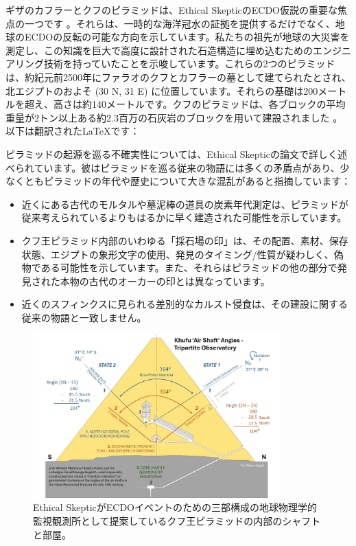 \documentclass[10pt,twocolumn,letterpaper]{article}
\begin{document}
ギザのカフラーとクフのピラミッドは、Ethical SkepticのECDO仮説の重要な焦点の一つです \cite{27}。それらは、一時的な海洋冠水の証拠を提供するだけでなく、地球のECDOの反転の可能な方向を示しています。私たちの祖先が地球の大災害を測定し、この知識を巨大で高度に設計された石造構造に埋め込むためのエンジニアリング技術を持っていたことを示唆しています。これらの2つのピラミッドは、約紀元前2500年にファラオのクフとカフラーの墓として建てられたとされ、北エジプトのおよそ (30 N, 31 E) に位置しています。それらの基礎は200メートルを超え、高さは約140メートルです。クフのピラミッドは、各ブロックの平均重量が2トン以上ある約2.3百万の石灰岩のブロックを用いて建設されました \cite{24, 25}。
以下は翻訳されたLaTeXです：

ピラミッドの起源を巡る不確実性については、Ethical Skepticの論文で詳しく述べられています。彼はピラミッドを巡る従来の物語には多くの矛盾点があり、少なくともピラミッドの年代や歴史について大きな混乱があると指摘しています：

\begin{flushleft}
\begin{itemize}
    \item 近くにある古代のモルタルや墓泥棒の道具の炭素年代測定は、ピラミッドが従来考えられているよりもはるかに早く建造された可能性を示しています。
    \item クフ王ピラミッド内部のいわゆる「採石場の印」は、その配置、素材、保存状態、エジプトの象形文字の使用、発見のタイミング/性質が疑わしく、偽物である可能性を示しています。また、それらはピラミッドの他の部分で発見された本物の古代のオーカーの印とは異なっています。
    \item 近くのスフィンクスに見られる差別的なカルスト侵食は、その建設に関する従来の物語と一致しません。
\end{itemize}
\end{flushleft}

\begin{figure}[b]
\begin{center}
\includegraphics[width=0.85\textwidth]{shafts.jpg}
\end{center}
   \caption{Ethical SkepticがECDOイベントのための三部構成の地球物理学的監視観測所として提案しているクフ王ピラミッドの内部のシャフトと部屋。 \cite{28}}
\label{fig:5}
\end{figure}
\end{document}
